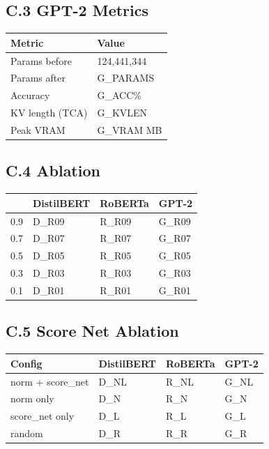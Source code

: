 \subsection{C.3 GPT-2 Metrics}

\begin{table}[H]
\centering
\small
\begin{tabular}{ll}
\toprule
\textbf{Metric} & \textbf{Value} \\
\midrule
Params before & 124,441,344 \\
Params after & {{G\_PARAMS}} \\
Accuracy & {{G\_ACC}}\% \\
KV length (TCA) & {{G\_KVLEN}} \\
Peak VRAM & {{G\_VRAM}} MB \\
\bottomrule
\end{tabular}
\end{table}

\subsection{C.4   Ablation}

\begin{table}[H]
\centering
\small
\begin{tabular}{llll}
\toprule
\textbf{} & \textbf{DistilBERT} & \textbf{RoBERTa} & \textbf{GPT-2} \\
\midrule
0.9 & {{D\_R09}} & {{R\_R09}} & {{G\_R09}} \\
0.7 & {{D\_R07}} & {{R\_R07}} & {{G\_R07}} \\
0.5 & {{D\_R05}} & {{R\_R05}} & {{G\_R05}} \\
0.3 & {{D\_R03}} & {{R\_R03}} & {{G\_R03}} \\
0.1 & {{D\_R01}} & {{R\_R01}} & {{G\_R01}} \\
\bottomrule
\end{tabular}
\end{table}

\subsection{C.5 Score Net Ablation}

\begin{table}[H]
\centering
\small
\begin{tabular}{llll}
\toprule
\textbf{Config} & \textbf{DistilBERT} & \textbf{RoBERTa} & \textbf{GPT-2} \\
\midrule
norm + score\_net & {{D\_NL}} & {{R\_NL}} & {{G\_NL}} \\
norm only & {{D\_N}} & {{R\_N}} & {{G\_N}} \\
score\_net only & {{D\_L}} & {{R\_L}} & {{G\_L}} \\
random & {{D\_R}} & {{R\_R}} & {{G\_R}} \\
\bottomrule
\end{tabular}
\end{table}

